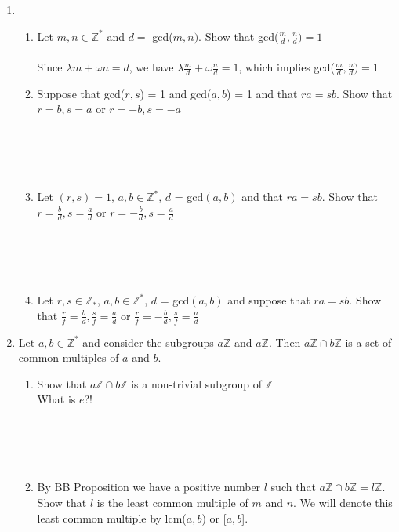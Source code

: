 \documentclass[11pt]{article}
\begin{document}
\begin{enumerate}
\newpage %
\item 
\begin{enumerate}
\item Let $m,n \in \mathbb{Z}^*$ and $d = $ gcd($m,n)$.  Show that gcd($\tfrac{m}{d} , \tfrac{n}{d}) = 1$
\\\\
Since $\lambda m + \omega n = d$, we have $\lambda \tfrac{m}{d} + \omega \tfrac{n}{d} = 1$, which implies gcd($\tfrac{m}{d} , \tfrac{n}{d}) = 1$
\\
\item Suppose that gcd($r,s$) = 1 and gcd($a,b$) = 1 and that $ra = sb$.  Show that $r=b, s = a$ or $r = -b, s = -a$
\\
\\
\\
\\
\\

\item Let $(r,s) = 1$, $a,b \in \mathbb{Z}^*$, $d$ = gcd$(a,b)$ and that $ra = sb$.  Show that $r = \tfrac{b}{d}, s = \tfrac{a}{d}$ or $r = -\tfrac{b}{d}, s=\tfrac{a}{d}$
\\
\\
\\
\\
\\

\item Let $r,s \in \mathbb{Z}_*$, $a,b \in \mathbb{Z}^*$, $d$ = gcd$(a,b)$ and suppose that $ra = sb$.  Show that $\tfrac{r}{f} = \tfrac{b}{d}, \tfrac{s}{f} = \tfrac{a}{d}$ or $\tfrac{r}{f} = -\tfrac{b}{d}, \tfrac{s}{f}=\tfrac{a}{d}$
\end{enumerate}


\newpage %
\item Let $a, b \in \mathbb{Z}^*$ and consider the subgroups $a\mathbb{Z}$ and $a\mathbb{Z}$.  Then $a\mathbb{Z} \cap b\mathbb{Z}$ is a set of common multiples of $a$ and $b$.
\begin{enumerate}
\item Show that $a\mathbb{Z} \cap b\mathbb{Z}$ is a non-trivial subgroup of $\mathbb{Z}$
\\ What is $e$?!
\\
\\
\\
\\
\\

\item By BB Proposition we have a positive number $l$ such that $a\mathbb{Z} \cap b\mathbb{Z} = l\mathbb{Z}$.  Show that $l$ is the least common multiple of $m$ and $n$.  We will denote this least common multiple by lcm($a,b$) or [$a,b$].
\\
\\
\\
\\
\\
\\


\end{enumerate}
\end{enumerate}
\end{document}
